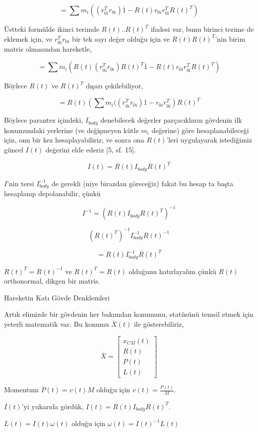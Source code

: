 \documentclass[12pt,fleqn]{article}\usepackage{../../common}
\begin{document}
$$
= \sum
m_i ( (r_{0i}^T r_{0i}) \overline{1} -  R(t) r_{0i} r_{0i}^T R(t)^T )
$$


Üstteki formülde ikinci terimde $R(t) .. R(t)^T$ ifadesi var, bunu
birinci terime de eklemek için, ve $r_{0i}^T r_{0i}$ bir tek sayı değer
olduğu için ve $R(t) R(t)^T$'nin birim matris olmasından hareketle,

$$
= \sum
m_i ( R(t) (r_{0i}^T r_{0i}) R(t)^T \overline{1} -  R(t) r_{0i} r_{0i}^T R(t)^T )
$$

Böylece $R(t)$ ve $R(t)^T$ dışarı çekilebiliyor,

$$
= R(t) \left( \sum 
m_i (( r_{0i}^T r_{0i}) \overline{1} -  r_{0i} r_{0i}^T
\right)  R(t)^T 
$$

Böylece parantez içindeki, $I_{body}$ denebilecek değerler parçacıkların
gövdenin ilk konumundaki yerlerine (ve değişmeyen kütle $m_i$ değerine) göre
hesaplanabileceği için, onu bir kez hesaplayabiliriz, ve sonra ona $R(t)$'leri
uygulayarak istediğimiz güncel $I(t)$ değerini elde ederiz [5, sf. 15].

$$
I(t) = R(t) I_{body} R(t)^T
$$

$I$'nin tersi $I_{body}^{-1}$ de gerekli (niye birazdan göreceğiz) fakat bu
hesap ta başta hesaplanıp depolanabilir, çünkü

$$
I^{-1} = ( R(t) I_{body} R(t)^T )^{-1} 
$$

$$
(R(t)^T)^{-1} I_{body}^{-1} R(t)^{-1} 
$$

$$
= R(t) I_{body}^{-1} R(t)^T
$$

$R(t)^T = R(t)^{-1}$ ve $R(t)^T = R(t)$ olduğunu hatırlayalım çünkü $R(t)$
orthonormal, dikgen bir matris. 

Hareketin Katı Gövde Denklemleri

Artık elimizde bir gövdenin her bakımdan konumunu, statüsünü temsil etmek için yeterli
matematik var. Bu konumu $\overline{X}(t)$ ile gösterebiliriz,

$$
\overline{X} = \left[\begin{array}{c}
x_{CM}(t) \\ R(t) \\ P(t) \\ L(t)
\end{array}\right]
$$

Momentum $P(t) = v(t) M$ olduğu için $v(t) = \frac{P(t)}{M}$.

$I(t)$'yi yukarıda gördük, $I(t) = R(t) I_{body} R(t)^T$.

$L(t) = I(t) \omega(t)$ olduğu için $\omega(t) = I(t)^{-1} L(t)$
\end{document}
